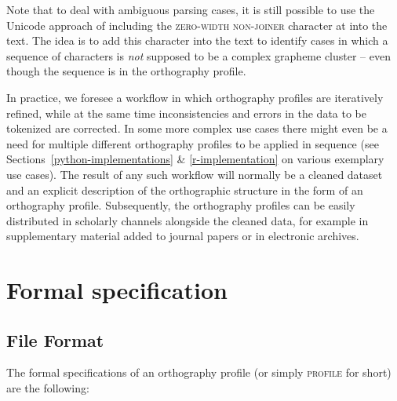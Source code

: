 Note that to deal with ambiguous parsing cases, it is still possible to use the
Unicode approach of including the \textsc{zero-width non-joiner} character at
 into the text. The idea is to add this character into the text to
identify cases in which a sequence of characters is \textit{not} supposed to be
a complex grapheme cluster -- even though the sequence is in the orthography
profile.

In practice, we foresee a workflow in which orthography profiles are iteratively
refined, while at the same time inconsistencies and errors in the data to be
tokenized are corrected. In some more complex use cases there might even be a
need for multiple different orthography profiles to be applied in sequence (see
Sections~\ref{python-implementations} \& \ref{r-implementation} on various exemplary use cases). The result of any such
workflow will normally be a cleaned dataset and an explicit description of the
orthographic structure in the form of an orthography profile. Subsequently, the
orthography profiles can be easily distributed in scholarly channels alongside
the cleaned data, for example in supplementary material added to journal papers
or in electronic archives.

\section{Formal specification}
\label{formal-specification-of-orthography-profiles}

\subsection*{File Format}
The formal specifications of an orthography profile (or simply \textsc{profile}
for short) are the following:

